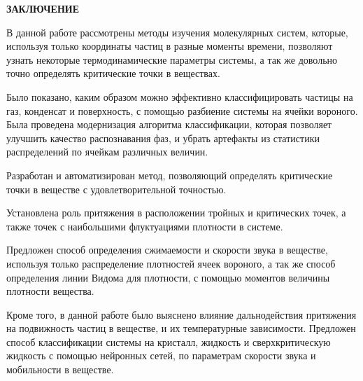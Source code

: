 \newpage
\begin{center}
\textbf{\large ЗАКЛЮЧЕНИЕ}
\end{center}



В данной работе рассмотрены методы изучения молекулярных систем, которые, используя только координаты частиц в разные моменты времени, позволяют узнать некоторые термодинамические параметры системы, а так же довольно точно определять критические точки в веществах. 

Было показано, каким образом можно эффективно классифицировать частицы на газ, конденсат и поверхность, с помощью разбиение системы на ячейки вороного. Была проведена модернизация алгоритма классификации, которая позволяет улучшить качество распознавания фаз, и убрать артефакты из статистики распределений по ячейкам различных величин.

Разработан и автоматизирован метод, позволяющий определять критические точки в веществе с удовлетворительной точностью.

Установлена роль притяжения в расположении тройных и критических точек, а также точек с наибольшими флуктуациями плотности в системе.

Предложен способ определения сжимаемости и скорости звука в веществе, используя только распределение плотностей ячеек вороного, а так же способ определения линии Видома для плотности, с помощью моментов величины плотности вещества.

Кроме того, в данной работе было выяснено влияние дальнодействия притяжения на подвижность частиц в веществе, и их температурные зависимости. Предложен способ классификации системы на кристалл, жидкость и сверхкритическую жидкость с помощью нейронных сетей, по параметрам скорости звука и мобильности в веществе.
